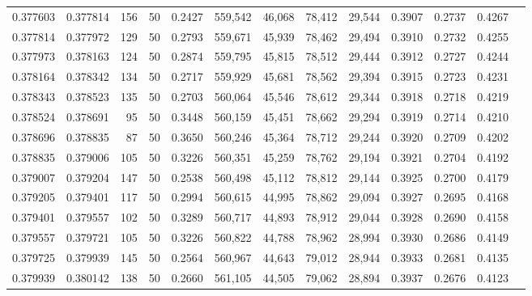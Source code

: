 \begin{tabular}{rrrrrrrrrrrrr}
0.377603 & 0.377814 &   156 &  50 &                                     0.2427 & 559,542 &  46,068 &  78,412 &  29,544 & 0.3907 & 0.2737 & 0.4267 \\
0.377814 & 0.377972 &   129 &  50 &                                     0.2793 & 559,671 &  45,939 &  78,462 &  29,494 & 0.3910 & 0.2732 & 0.4255 \\
0.377973 & 0.378163 &   124 &  50 &                                     0.2874 & 559,795 &  45,815 &  78,512 &  29,444 & 0.3912 & 0.2727 & 0.4244 \\
0.378164 & 0.378342 &   134 &  50 &                                     0.2717 & 559,929 &  45,681 &  78,562 &  29,394 & 0.3915 & 0.2723 & 0.4231 \\
0.378343 & 0.378523 &   135 &  50 &                                     0.2703 & 560,064 &  45,546 &  78,612 &  29,344 & 0.3918 & 0.2718 & 0.4219 \\
0.378524 & 0.378691 &    95 &  50 &                                     0.3448 & 560,159 &  45,451 &  78,662 &  29,294 & 0.3919 & 0.2714 & 0.4210 \\
0.378696 & 0.378835 &    87 &  50 &                                     0.3650 & 560,246 &  45,364 &  78,712 &  29,244 & 0.3920 & 0.2709 & 0.4202 \\
0.378835 & 0.379006 &   105 &  50 &                                     0.3226 & 560,351 &  45,259 &  78,762 &  29,194 & 0.3921 & 0.2704 & 0.4192 \\
0.379007 & 0.379204 &   147 &  50 &                                     0.2538 & 560,498 &  45,112 &  78,812 &  29,144 & 0.3925 & 0.2700 & 0.4179 \\
0.379205 & 0.379401 &   117 &  50 &                                     0.2994 & 560,615 &  44,995 &  78,862 &  29,094 & 0.3927 & 0.2695 & 0.4168 \\
0.379401 & 0.379557 &   102 &  50 &                                     0.3289 & 560,717 &  44,893 &  78,912 &  29,044 & 0.3928 & 0.2690 & 0.4158 \\
0.379557 & 0.379721 &   105 &  50 &                                     0.3226 & 560,822 &  44,788 &  78,962 &  28,994 & 0.3930 & 0.2686 & 0.4149 \\
0.379725 & 0.379939 &   145 &  50 &                                     0.2564 & 560,967 &  44,643 &  79,012 &  28,944 & 0.3933 & 0.2681 & 0.4135 \\
0.379939 & 0.380142 &   138 &  50 &                                     0.2660 & 561,105 &  44,505 &  79,062 &  28,894 & 0.3937 & 0.2676 & 0.4123 \\

\end{tabular}
